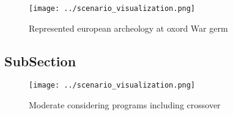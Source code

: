 \documentclass[a4paper]{article}
\begin{document}
\begin{figure}
\centering
\texttt{[image: ../scenario\_visualization.png]}
\caption{Represented european archeology at oxord War germ
}
\end{figure}
 
\subsection{SubSection}

\begin{figure}
\centering
\texttt{[image: ../scenario\_visualization.png]}
\caption{Moderate considering programs including crossover
}
\end{figure}
 
\end{document}
